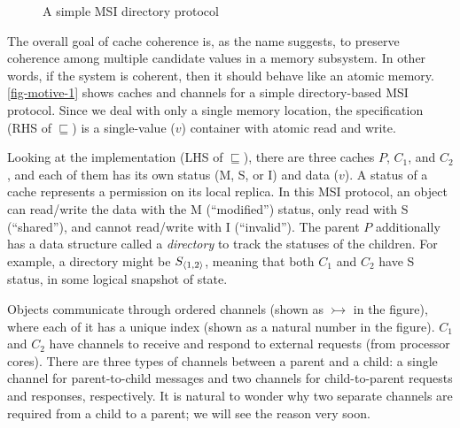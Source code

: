 \documentclass[sigplan,10pt,review,anonymous,screen]{acmart}\settopmatter{printfolios=true,printccs=false,printacmref=false}
\begin{document}

\begin{figure}[h]
  \caption{A simple MSI directory protocol}
  \vspace{-5pt}
  \label{fig-motive-1}
\end{figure}

The overall goal of cache coherence is, as the name suggests, to preserve coherence among multiple candidate values in a memory subsystem.
In other words, if the system is coherent, then it should behave like an atomic memory.
\autoref{fig-motive-1} shows caches and channels for a simple directory-based MSI protocol.
Since we deal with only a single memory location, the specification (RHS of $\sqsubseteq$) is a single-value ($v$) container with atomic read and write.

Looking at the implementation (LHS of $\sqsubseteq$), there are three caches $P$, $C_1$, and $C_2$, and each of them has its own status (M, S, or I) and data ($v$).
A status of a cache represents a permission on its local replica.
In this MSI protocol, an object can read/write the data with the M (``modified'') status, only read with S (``shared''), and cannot read/write with I (``invalid'').
The parent $P$ additionally has a data structure called a \emph{directory} to track the statuses of the children.
For example, a directory might be $S_{\langle 1, 2 \rangle}$, meaning that both $C_1$ and $C_2$ have S status, in some logical snapshot of state.

Objects communicate through ordered channels (shown as $\rightarrowtail$ in the figure), where each of it has a unique index (shown as a natural number in the figure).
$C_1$ and $C_2$ have channels to receive and respond to external requests (from processor cores).
There are three types of channels between a parent and a child: a single channel for parent-to-child messages and two channels for child-to-parent requests and responses, respectively.
It is natural to wonder why two separate channels are required from a child to a parent; we will see the reason very soon.
\end{document}
